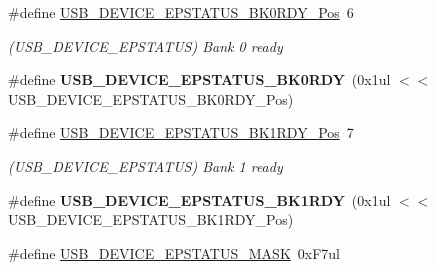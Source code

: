 \begin{DoxyCompactItemize}
\item 
\hypertarget{group___s_a_m_l21___u_s_b_ga3444dfd4231e1cdd69b5fcda14762313}{}\#define \hyperlink{group___s_a_m_l21___u_s_b_ga3444dfd4231e1cdd69b5fcda14762313}{U\+S\+B\+\_\+\+D\+E\+V\+I\+C\+E\+\_\+\+E\+P\+S\+T\+A\+T\+U\+S\+\_\+\+B\+K0\+R\+D\+Y\+\_\+\+Pos}~6\label{group___s_a_m_l21___u_s_b_ga3444dfd4231e1cdd69b5fcda14762313}

\begin{DoxyCompactList}\small\item\em (U\+S\+B\+\_\+\+D\+E\+V\+I\+C\+E\+\_\+\+E\+P\+S\+T\+A\+T\+U\+S) Bank 0 ready \end{DoxyCompactList}\item 
\hypertarget{group___s_a_m_l21___u_s_b_gac527be721a3068c86b8d73282d5c662a}{}\#define {\bfseries U\+S\+B\+\_\+\+D\+E\+V\+I\+C\+E\+\_\+\+E\+P\+S\+T\+A\+T\+U\+S\+\_\+\+B\+K0\+R\+D\+Y}~(0x1ul $<$$<$ U\+S\+B\+\_\+\+D\+E\+V\+I\+C\+E\+\_\+\+E\+P\+S\+T\+A\+T\+U\+S\+\_\+\+B\+K0\+R\+D\+Y\+\_\+\+Pos)\label{group___s_a_m_l21___u_s_b_gac527be721a3068c86b8d73282d5c662a}

\item 
\hypertarget{group___s_a_m_l21___u_s_b_ga11d68beeb7b2fdc943fab3307da736d2}{}\#define \hyperlink{group___s_a_m_l21___u_s_b_ga11d68beeb7b2fdc943fab3307da736d2}{U\+S\+B\+\_\+\+D\+E\+V\+I\+C\+E\+\_\+\+E\+P\+S\+T\+A\+T\+U\+S\+\_\+\+B\+K1\+R\+D\+Y\+\_\+\+Pos}~7\label{group___s_a_m_l21___u_s_b_ga11d68beeb7b2fdc943fab3307da736d2}

\begin{DoxyCompactList}\small\item\em (U\+S\+B\+\_\+\+D\+E\+V\+I\+C\+E\+\_\+\+E\+P\+S\+T\+A\+T\+U\+S) Bank 1 ready \end{DoxyCompactList}\item 
\hypertarget{group___s_a_m_l21___u_s_b_gaabcb817d2a94c1b72a8458ae7764bbc1}{}\#define {\bfseries U\+S\+B\+\_\+\+D\+E\+V\+I\+C\+E\+\_\+\+E\+P\+S\+T\+A\+T\+U\+S\+\_\+\+B\+K1\+R\+D\+Y}~(0x1ul $<$$<$ U\+S\+B\+\_\+\+D\+E\+V\+I\+C\+E\+\_\+\+E\+P\+S\+T\+A\+T\+U\+S\+\_\+\+B\+K1\+R\+D\+Y\+\_\+\+Pos)\label{group___s_a_m_l21___u_s_b_gaabcb817d2a94c1b72a8458ae7764bbc1}

\item 
\hypertarget{group___s_a_m_l21___u_s_b_gac8dafe05b0cfb5feff6527ae0e788ea0}{}\#define \hyperlink{group___s_a_m_l21___u_s_b_gac8dafe05b0cfb5feff6527ae0e788ea0}{U\+S\+B\+\_\+\+D\+E\+V\+I\+C\+E\+\_\+\+E\+P\+S\+T\+A\+T\+U\+S\+\_\+\+M\+A\+S\+K}~0x\+F7ul\label{group___s_a_m_l21___u_s_b_gac8dafe05b0cfb5feff6527ae0e788ea0}


\end{DoxyCompactItemize}
